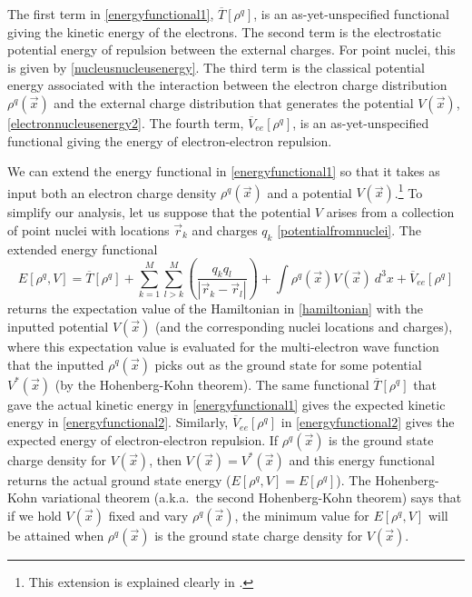 \documentclass[12pt,onecolumn,secnumarabic,amsmath,amssymb,balancelastpage,nofootinbib]{article}
\begin{document}
The first term in \eqref{energyfunctional1}, $\overline{T}[\rho^q]$, is an as-yet-unspecified functional giving the kinetic energy of the electrons.  The second term is the electrostatic potential energy of repulsion between the external charges.  For point nuclei, this is given by \eqref{nucleusnucleusenergy}.  The third term is the classical potential energy associated with the interaction between the electron charge distribution $\rho^q(\vec{x})$ and the external charge distribution that generates the potential $V(\vec{x})$, \eqref{electronnucleusenergy2}.  The fourth term, $\overline{V}_{ee}[\rho^q]$, is an as-yet-unspecified functional giving the energy of electron-electron repulsion.

We can extend the energy functional in \eqref{energyfunctional1} so that it takes as input both an electron charge density $\rho^q(\vec{x})$ and a potential $V(\vec{x})$.\footnote{This extension is explained clearly in \cite[pg.\ 5384]{baerends1997}.}  To simplify our analysis, let us suppose that the potential $V$ arises from a collection of point nuclei with locations $\vec{r}_k$ and charges $q_k$ \eqref{potentialfromnuclei}.  The extended energy functional
\begin{equation}
E[\rho^q,V]=\overline{T}[\rho^q]+\sum_{k=1}^{M}\sum_{l>k}^{M} \left(\frac{q_k q_l}{|\vec{r}_k-\vec{r}_l|}\right)+\int{\rho^q(\vec{x}) V(\vec{x}) \  d^3 x}+\overline{V}_{ee}[\rho^q]
\label{energyfunctional2}
\end{equation}
returns the expectation value of the Hamiltonian in \eqref{hamiltonian} with the inputted potential $V(\vec{x})$ (and the corresponding nuclei locations and charges), where this expectation value is evaluated for the multi-electron wave function that the inputted $\rho^q(\vec{x})$ picks out as the ground state for some potential $V^*(\vec{x})$ (by the Hohenberg-Kohn theorem).  The same functional $\overline{T}[\rho^q]$ that gave the actual kinetic energy in \eqref{energyfunctional1} gives the expected kinetic energy in \eqref{energyfunctional2}.  Similarly, $\overline{V}_{ee}[\rho^q]$ in \eqref{energyfunctional2} gives the expected energy of electron-electron repulsion.  If $\rho^q(\vec{x})$ is the ground state charge density for $V(\vec{x})$, then $V(\vec{x})=V^*(\vec{x})$ and this energy functional returns the actual ground state energy ($E[\rho^q,V]=E[\rho^q]$).  The Hohenberg-Kohn variational theorem (a.k.a.\ the second Hohenberg-Kohn theorem) says that if we hold $V(\vec{x})$ fixed and vary $\rho^q(\vec{x})$, the minimum value for $E[\rho^q,V]$ will be attained when $\rho^q(\vec{x})$ is the ground state charge density for $V(\vec{x})$.
\end{document}
